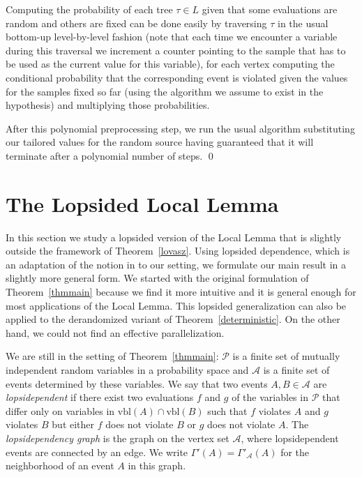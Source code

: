 \documentclass[11pt,a4paper]{article}
\begin{document}
Computing the probability of each tree $\tau \in L$ given that some
evaluations are random and others are fixed can be done easily by traversing $\tau$ in the usual
bottom-up level-by-level fashion (note that each time we encounter a variable during this traversal
we increment a counter pointing to the sample that has to be used as the current value for this
variable), for each vertex computing the conditional probability that the
corresponding event is violated given the values for the samples fixed so far (using the algorithm
we assume to exist in the hypothesis) and multiplying those probabilities.

After this polynomial preprocessing step, we run the usual algorithm substituting our tailored
values for the random source having guaranteed that it will terminate after a polynomial number
of steps. \qed

\section{The Lopsided Local Lemma}

In this section we study a lopsided version of the Local Lemma that is
slightly outside the framework of Theorem~\ref{lovasz}. Using lopsided
dependence, which is an adaptation of the notion in \cite{ES91} to our
setting, we formulate our main result in a slightly more general form. We
started with the original formulation of Theorem~\ref{thmmain}
because we find it more intuitive and it is general enough for most
applications of the Local Lemma. This lopsided generalization can also be
applied to the derandomized variant of Theorem~\ref{deterministic}. On the
other hand, we could not find an effective parallelization. %

We are still in the setting of Theorem~\ref{thmmain}: $\mathcal{P}$ is a finite set
of mutually independent random variables in a probability space and $\mathcal{A}$
is a finite set of events determined by these variables. We say that two
events $A,B\in\mathcal{A}$ are {\em lopsidependent} if there exist two evaluations $f$
and $g$ of the variables in $\mathcal{P}$ that differ only on variables in
$\mbox{vbl}(A)\cap\mbox{vbl}(B)$ such that $f$ violates $A$ and $g$ violates
$B$ but either $f$ does not violate $B$ or $g$ does not violate $A$. The {\em
lopsidependency graph} is the graph on the vertex set $\mathcal{A}$, where
lopsidependent events are connected by an edge. We write
$\Gamma'(A)=\Gamma'_{\mathcal{A}}(A)$ for the neighborhood of an event $A$ in
this graph.
\end{document}
